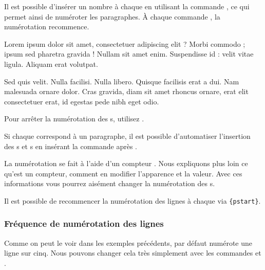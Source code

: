Il est possible d'insérer un nombre à chaque  en utilisant la commande \label{numberpstarttrue}, ce qui permet ainsi de numéroter les paragraphes. À chaque commande , la numérotation recommence.

\begin{minipage}{0.8\textwidth}
\numberpstarttrue
\beginnumbering
\pstart 
Lorem ipsum dolor sit amet, consectetuer adipiscing elit ?
Morbi commodo ; ipsum sed pharetra gravida !
Nullam sit amet enim. Suspendisse id : velit vitae ligula. 
Aliquam erat volutpat. \pend


\pstart Sed quis velit. Nulla facilisi. Nulla libero. 
 Quisque facilisis erat a dui.
Nam malesuada ornare dolor.
Cras gravida, diam sit amet rhoncus ornare, 
erat  elit consectetuer erat, id egestas pede nibh eget odio.
\pend
\endnumbering
\end{minipage}

Pour arrêter la numérotation des s,  utilisez  .

\begin{plusloins}
\label{autopar}Si chaque  correspond à un paragraphe, il est possible d'automatiser l'insertion des s et s en insérant la commande  après .
\end{plusloins}

\begin{plusloins}
La numérotation se fait à l'aide d'un compteur . Nous expliquons plus loin ce qu'est un compteur, comment en modifier l'apparence et la valeur. Avec ces informations vous pourrez aisément changer la numérotation des s.
\end{plusloins}

\begin{plusloins}
Il est possible de recommencer la numérotation des lignes à chaque   via \verb={pstart}=.
\end{plusloins}

\subsubsection{Fréquence de numérotation des lignes}

Comme on peut le voir dans les exemples précédents, par défaut  numérote  une ligne sur cinq. Nous pouvons changer cela très simplement avec les commandes 
 et .

